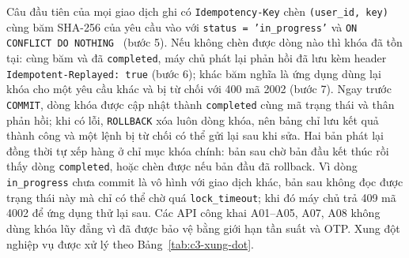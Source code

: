 
Câu đầu tiên của mọi giao dịch ghi có \texttt{Idempotency-Key} chèn \texttt{(user\_id, key)} cùng băm SHA-256 của yêu cầu vào  với \texttt{status = 'in\_progress'} và \texttt{ON CONFLICT DO NOTHING}~\cite{idempotencykey} (bước 5). Nếu không chèn được dòng nào thì khóa đã tồn tại: cùng băm và đã \texttt{completed}, máy chủ phát lại phản hồi đã lưu kèm header \texttt{Idempotent-Replayed: true} (bước 6); khác băm nghĩa là ứng dụng dùng lại khóa cho một yêu cầu khác và bị từ chối với 400 mã 2002 (bước 7). Ngay trước \texttt{COMMIT}, dòng khóa được cập nhật thành \texttt{completed} cùng mã trạng thái và thân phản hồi; khi có lỗi, \texttt{ROLLBACK} xóa luôn dòng khóa, nên bảng chỉ lưu kết quả thành công và một lệnh bị từ chối có thể gửi lại sau khi sửa. Hai bản phát lại đồng thời tự xếp hàng ở chỉ mục khóa chính: bản sau chờ bản đầu kết thúc rồi thấy dòng \texttt{completed}, hoặc chèn được nếu bản đầu đã rollback. Vì dòng \texttt{in\_progress} chưa commit là vô hình với giao dịch khác, bản sau không đọc được trạng thái này mà chỉ có thể chờ quá \texttt{lock\_timeout}; khi đó máy chủ trả 409 mã 4002 để ứng dụng thử lại sau. Các API công khai A01--A05, A07, A08 không dùng khóa lũy đẳng vì đã được bảo vệ bằng giới hạn tần suất và OTP. Xung đột nghiệp vụ được xử lý theo Bảng~\ref{tab:c3-xung-dot}.

